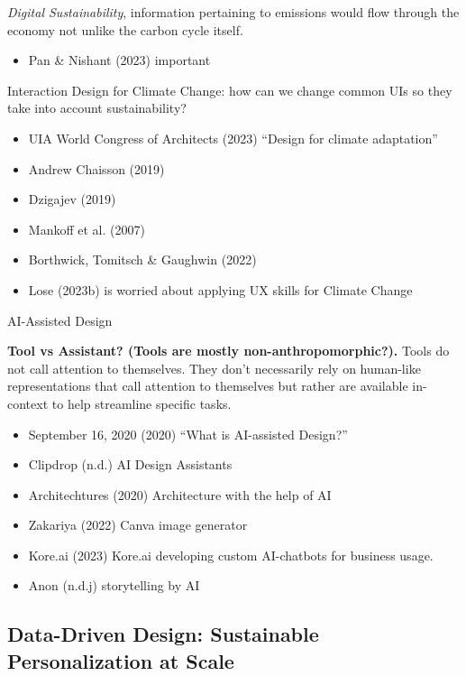 \documentclass[
  letterpaper,
  DIV=11,
  numbers=noendperiod]{scrartcl}
\providecommand{\tightlist}{%
  \setlength{\itemsep}{0pt}\setlength{\parskip}{0pt}}\usepackage{longtable,booktabs,array}
\begin{document}
\emph{Digital Sustainability}, information pertaining to emissions would
flow through the economy not unlike the carbon cycle itself.

\begin{itemize}
\tightlist
\item
  Pan \& Nishant (2023) important
\end{itemize}

Interaction Design for Climate Change: how can we change common UIs so
they take into account sustainability?

\begin{itemize}
\tightlist
\item
  UIA World Congress of Architects (2023) ``Design for climate
  adaptation''
\item
  Andrew Chaisson (2019)
\item
  Dzigajev (2019)
\item
  Mankoff et al. (2007)
\item
  Borthwick, Tomitsch \& Gaughwin (2022)
\item
  Lose (2023b) is worried about applying UX skills for Climate Change
\end{itemize}

AI-Assisted Design

\textbf{Tool vs Assistant? (Tools are mostly non-anthropomorphic?).}
Tools do not call attention to themselves. They don't necessarily rely
on human-like representations that call attention to themselves but
rather are available in-context to help streamline specific tasks.

\begin{itemize}
\tightlist
\item
  September 16, 2020 (2020) ``What is AI-assisted Design?''
\item
  Clipdrop (n.d.) AI Design Assistants
\item
  Architechtures (2020) Architecture with the help of AI
\item
  Zakariya (2022) Canva image generator
\item
  Kore.ai (2023) Kore.ai developing custom AI-chatbots for business
  usage.
\item
  Anon (n.d.j) storytelling by AI
\end{itemize}

\subsection{Data-Driven Design: Sustainable Personalization at
Scale}\label{data-driven-design-sustainable-personalization-at-scale}
\end{document}
